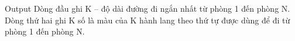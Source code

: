 Output
Dòng đầu ghi K – độ dài đường đi ngắn nhất từ phòng 1 đến phòng N.   
\\   Dòng thứ hai ghi K số là màu của K hành lang theo thứ tự được dùng để đi từ phòng 1 đến phòng N.